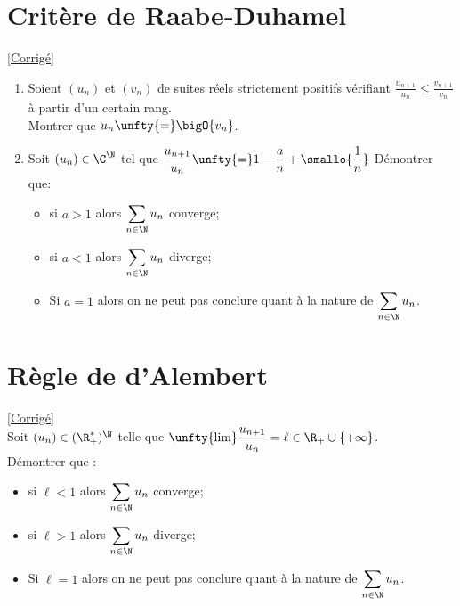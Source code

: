 \documentclass{book}
\begin{document}
	\section{Critère de Raabe-Duhamel }
	\textcolor{blue}{\hyperref[sec:critere-de-raabe-duhamel-etoile2]{[Corrigé]}}\\
	\label{Critère de Raabe-Duhamel}
	\begin{enumerate}[leftmargin=*]
		\item Soient $(u_n)$ et $(v_n)$ de suites réels strictement positifs vérifiant $\displaystyle\frac{u_{n+1}}{u_n}\leq \frac{v_{n+1}}{v_n}$ à partir d'un certain rang.\\Montrer que $u_n\unfty{=}\bigO{v_n}$.
		\item
		Soit $(u_n)\in\C^\N$ tel que $\displaystyle\frac{u_{n+1}}{u_n}\unfty{=}1-\frac{a}{n}+\smallo{\frac{1}{n}}$
		Démontrer que:
		\begin{itemize}
			\item si $a>1$ alors $\displaystyle\sum\limits_{n\in \N} u_n$ converge;
			\item si $a<1$ alors $\displaystyle\sum\limits_{n\in \N} u_n$ diverge;
			\item Si $a=1$ alors on ne peut pas conclure quant à la nature de $\displaystyle\sum\limits_{n\in \N} u_n$.
		\end{itemize}
	\end{enumerate}
	
	\section{Règle de d'Alembert }
	\textcolor{blue}{\hyperref[sec:regle-de-dalembert]{[Corrigé]}}\\
	\label{Règle de d'Alembert}
	Soit $(u_n)\in(\R^*_+)^\N$ telle que $\unfty{\lim}\displaystyle\frac{u_{n+1}}{u_n}=\ell\in\R_+\cup\{+\infty\}$.
	\\Démontrer que :
	\begin{itemize}
		\item si $\ell<1$ alors $\displaystyle\sum_{n\in \N} u_n$ converge;
		\item si $\ell>1$ alors $\displaystyle\sum_{n\in \N} u_n$ diverge;
		\item Si $\ell=1$ alors on ne peut pas conclure quant à la nature de $\displaystyle\sum_{n\in \N} u_n$.
	\end{itemize}
	
\end{document}
